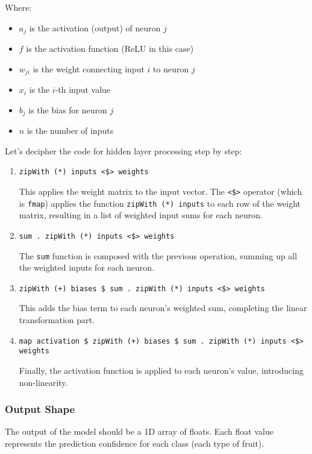 \documentclass[12pt,a4paper]{article}
\begin{document}
Where:
\begin{itemize}
    \item $a_j$ is the activation (output) of neuron $j$
    \item $f$ is the activation function (ReLU in this case)
    \item $w_{ji}$ is the weight connecting input $i$ to neuron $j$
    \item $x_i$ is the $i$-th input value
    \item $b_j$ is the bias for neuron $j$
    \item $n$ is the number of inputs
\end{itemize}

Let's decipher the code for hidden layer processing step by step:

\begin{enumerate}
    \item \texttt{zipWith (*) inputs <\$> weights}

    This applies the weight matrix to the input vector. The \texttt{<\$>} operator (which is \texttt{fmap}) applies the function \texttt{zipWith (*) inputs} to each row of the weight matrix, resulting in a list of weighted input sums for each neuron.

    \item \texttt{sum . zipWith (*) inputs <\$> weights}

    The \texttt{sum} function is composed with the previous operation, summing up all the weighted inputs for each neuron.

    \item \texttt{zipWith (+) biases \$ sum . zipWith (*) inputs <\$> weights}

    This adds the bias term to each neuron's weighted sum, completing the linear transformation part.

    \item \texttt{map activation \$ zipWith (+) biases \$ sum . zipWith (*) inputs <\$> weights}

    Finally, the activation function is applied to each neuron's value, introducing non-linearity.
\end{enumerate}

\subsubsection{Output Shape}
The output of the model should be a 1D array of floats. Each float value represents the prediction confidence for each class (each type of fruit).
\end{document}
